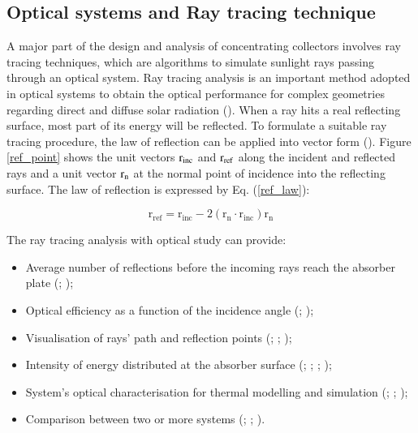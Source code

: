 \subsection{Optical systems and Ray tracing technique}

A major part of the design and analysis of concentrating collectors involves ray tracing techniques, which are algorithms to simulate sunlight rays passing through an optical system. Ray tracing analysis is an important method adopted in optical systems to obtain the optical performance for complex geometries regarding direct and diffuse solar radiation (\cite{Ali2013}). When a ray hits a real reflecting surface, most part of its energy will be reflected. To formulate a suitable ray tracing procedure, the law of reflection can be applied into vector form (\cite{Winston2005}). Figure \ref{ref_point} shows the unit vectors $\rm{r_{inc}}$ and $\rm{r_{ref}}$ along the incident and reflected rays and a unit vector $\rm{r_n}$ at the normal point of incidence into the reflecting surface. The law of reflection is expressed by Eq. (\ref{ref_law}):

\begin{equation}
	\mathrm{{r_{ref}} = {r_{inc}} - 2({r_n} \cdot {r_{inc}}){r_n}}
	\label{ref_law}
	\end{equation}


The ray tracing analysis with optical study can provide:

\begin{itemize}
	\itemsep-5pt
		\item Average number of reflections before the incoming rays reach the absorber plate (\cite{Shams2013}; \cite{Benrejeb2016});
		\item Optical efficiency as a function of the incidence angle (\cite{Kothdiwala1996}; \cite{Souliotis2011});
		\item Visualisation of rays' path and reflection points (\cite{Mallick2007}; \cite{Ratismith2014}; \cite{Ustaoglu2016});
		\item Intensity of energy distributed at the absorber surface (\cite{Smyth1999}; \cite{Sellami2013}; \cite{Ali2014}; \cite{Bellos2016});
		\item System's optical characterisation for thermal modelling and simulation (\cite{Mallick2007}; \cite{Shams2013}; \cite{Bellos2016});
		\item Comparison between two or more systems (\cite{Zacharopoulos2000}; \cite{Sarmah2011}; \cite{Wu2009}).
	\end{itemize}

